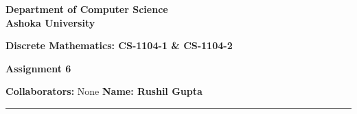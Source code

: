 \documentclass[a4paper]{article}
\begin{document}
\begin{center}
{\large \bf \color{red}  Department of Computer Science} \\
{\large \bf \color{red}  Ashoka University} \\

\vspace{0.1in}

{\large \bf \color{blue}  Discrete Mathematics: CS-1104-1 \& CS-1104-2}

\vspace{0.05in}

    { \bf \color{YellowOrange} Assignment 6}
\end{center}
\medskip

{\textbf{Collaborators:} None} \hfill {\textbf{Name: Rushil Gupta} }

\bigskip
\hrule
\end{document}

